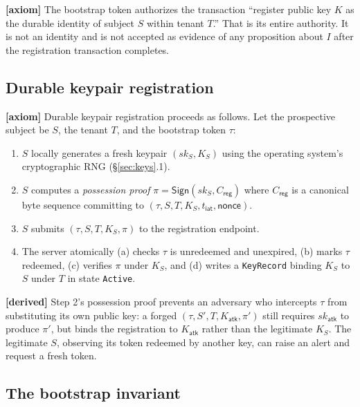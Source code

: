 \documentclass[11pt,a4paper]{article}
\newcommand{\axiom}{\textcolor{axiomcolor}{\textbf{[axiom]}}\xspace}
\newcommand{\derived}{\textcolor{derivedcolor}{\textbf{[derived]}}\xspace}
\begin{document}
\axiom{} The bootstrap token authorizes the transaction ``register
public key $K$ as the durable identity of subject $S$ within tenant
$T$.'' That is its entire authority. It is not an identity and is not
accepted as evidence of any proposition about $I$ after the registration
transaction completes.

\subsection{Durable keypair registration}

\axiom{} Durable keypair registration proceeds as follows. Let the
prospective subject be $S$, the tenant $T$, and the bootstrap token
$\tau$:

\begin{enumerate}[leftmargin=2em,itemsep=0.2em]
    \item $S$ locally generates a fresh keypair
    $(\mathit{sk}_S, K_S)$ using the operating system's cryptographic
    RNG (\S\ref{sec:keys}.1).
    \item $S$ computes a \emph{possession proof}
    $\pi = \mathsf{Sign}(\mathit{sk}_S, C_{\mathsf{reg}})$ where
    $C_{\mathsf{reg}}$ is a canonical byte sequence committing to
    $(\tau, S, T, K_S, t_{\mathsf{iat}}, \mathsf{nonce})$.
    \item $S$ submits $(\tau, S, T, K_S, \pi)$ to the registration
    endpoint.
    \item The server atomically (a) checks $\tau$ is unredeemed and
    unexpired, (b) marks $\tau$ redeemed, (c) verifies $\pi$ under
    $K_S$, and (d) writes a \texttt{KeyRecord} binding $K_S$ to
    $S$ under $T$ in state \texttt{Active}.
\end{enumerate}

\derived{} Step 2's possession proof prevents an adversary who
intercepts $\tau$ from substituting its own public key: a forged
$(\tau, S', T, K_{\mathsf{atk}}, \pi')$ still requires
$\mathit{sk}_{\mathsf{atk}}$ to produce $\pi'$, but binds the
registration to $K_{\mathsf{atk}}$ rather than the legitimate $K_S$.
The legitimate $S$, observing its token redeemed by another key, can
raise an alert and request a fresh token.

\subsection{The bootstrap invariant}
\end{document}
